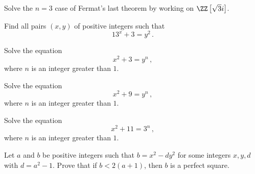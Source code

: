 \documentclass[11pt]{scrartcl}
\begin{document}
\begin{problem}
Solve the \(n=3\) case of Fermat's last theorem by working on \(\ZZ \left[\sqrt 3i\right] \).
\end{problem}
\begin{problem}
Find all pairs \((x, y)\) of positive integers such that
\[
13^{x}+3=y^{2} \,.
\]
\end{problem}
\begin{problem}
Solve the equation
\[
x^{2}+3=y^{n} \, ,
\]
where \(n\) is an integer greater than \(1\).
\end{problem}
\begin{problem}
Solve the equation
\[
x^{2}+9=y^{n} \, ,
\]
where \(n\) is an integer greater than \(1\).
\end{problem}
\begin{problem}
Solve the equation
\[
x^{2}+11=3^{n} \, ,
\]
where \(n\) is an integer greater than \(1\).
\end{problem}
\begin{problem}
Let \(a\) and \(b\) be positive integers such that \(b=x^{2}-d y^{2}\) for some integers \(x, y, d\) with \(d=a^{2}-1\). Prove that if \(b<2(a+1)\), then \(b\) is a perfect square.
\end{problem}
\end{document}
